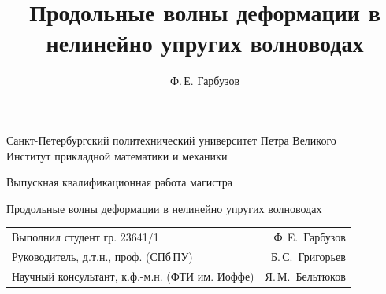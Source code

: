 \documentclass[usenames,dvipsnames]{beamer}
\title[Волны в нелинейно упругих стержнях]{Продольные волны деформации в нелинейно упругих волноводах}
\author[Ф.\,Е. Гарбузов]{Ф.\,Е. Гарбузов}
\begin{document}


\begin{frame}[plain]
\centering
{\footnotesize
Санкт-Петербургский политехнический университет Петра Великого\\
Институт прикладной математики и механики
}

\vspace{12mm}
Выпускная квалификационная работа магистра
\vspace{3mm}

\begin{block}{}
	\centering
	\Large\color{white}
	Продольные волны деформации в нелинейно упругих волноводах
\end{block}
\vspace{12mm}

{ \footnotesize 
\begin{tabularx}{.9\linewidth}{Xr}
	Выполнил студент гр. 23641/1 \vspace{2mm}& Ф.\,E.~Гарбузов\\
	Руководитель, д.т.н., проф. (СПб\,ПУ)\vspace{2mm} & Б.\,С.~Григорьев\\
	Научный консультант, к.ф.-м.н. (ФТИ им. Иоффе) & Я.\,М.~Бельтюков\\
\end{tabularx} 
}
\end{frame}
\end{document}
